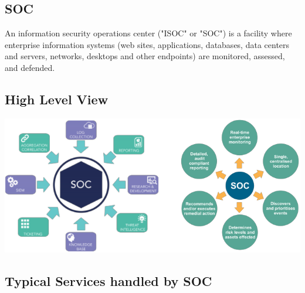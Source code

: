 \documentclass[8pt]{extarticle}
\begin{document}
\begin{multicols}{3}
\section{SOC}
An information security operations center ("ISOC" or "SOC") is a facility where enterprise information systems 
(web sites, applications, databases, data centers and servers, networks, desktops and other endpoints) 
are monitored, assessed, and defended. 

\subsection{High Level View}
\begin{center}
    \begin{minipage}{\columnwidth}
        \includegraphics[width=\columnwidth]{soc-high-level.png}
    \end{minipage}
\end{center}

\subsection{Typical Services handled by SOC}


\end{multicols}
\end{document}
